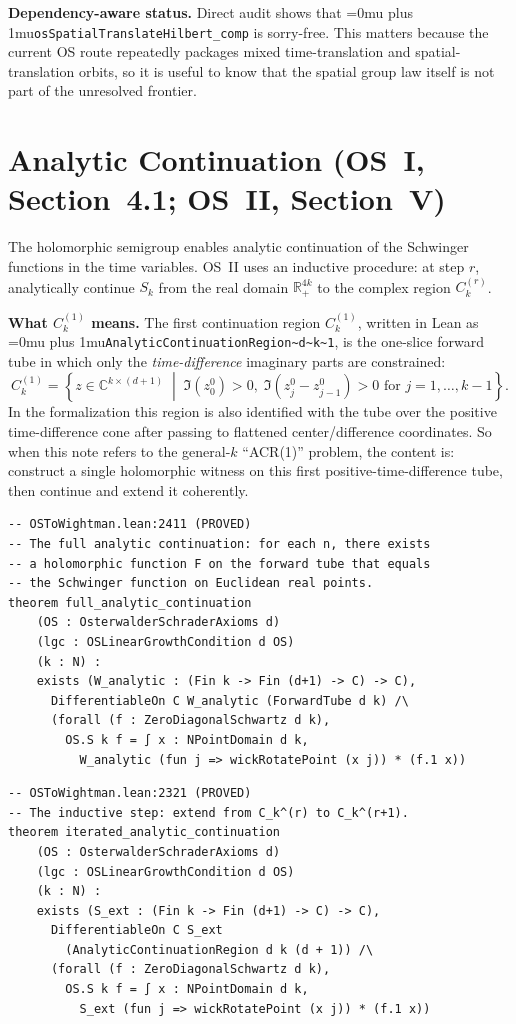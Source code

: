 \documentclass[11pt,a4paper]{article}
\newcommand{\leanname}[1]{\begingroup\Urlmuskip=0mu plus 1mu\relax\nolinkurl{#1}\endgroup}
\begin{document}
\medskip\noindent
\textbf{Dependency-aware status.}
Direct audit shows that \leanname{osSpatialTranslateHilbert\_comp} is
sorry-free. This matters because the current OS route repeatedly packages mixed
time-translation and spatial-translation orbits, so it is useful to know that
the spatial group law itself is not part of the unresolved frontier.


\section{Analytic Continuation (OS~I, Section~4.1; OS~II, Section~V)}

The holomorphic semigroup enables analytic continuation of the Schwinger
functions in the time variables. OS~II uses an inductive procedure:
at step $r$, analytically continue $S_k$ from the real domain $\mathbb{R}^{4k}_+$
to the complex region $C_k^{(r)}$.

\medskip\noindent
\textbf{What \(C_k^{(1)}\) means.}
The first continuation region \(C_k^{(1)}\), written in Lean as
\leanname{AnalyticContinuationRegion~d~k~1}, is the one-slice forward tube in
which only the \emph{time-difference} imaginary parts are constrained:
\[
C_k^{(1)}
=
\left\{
z \in \mathbb{C}^{k \times (d+1)}
\;\middle|\;
\Im(z_0^0) > 0,\;
\Im(z_j^0 - z_{j-1}^0) > 0 \text{ for } j=1,\dots,k-1
\right\}.
\]
In the formalization this region is also identified with the tube over the
positive time-difference cone after passing to flattened center/difference
coordinates. So when this note refers to the general-\(k\) ``ACR(1)'' problem,
the content is: construct a single holomorphic witness on this first
positive-time-difference tube, then continue and extend it coherently.

\begin{lstlisting}
-- OSToWightman.lean:2411 (PROVED)
-- The full analytic continuation: for each n, there exists
-- a holomorphic function F on the forward tube that equals
-- the Schwinger function on Euclidean real points.
theorem full_analytic_continuation
    (OS : OsterwalderSchraderAxioms d)
    (lgc : OSLinearGrowthCondition d OS)
    (k : N) :
    exists (W_analytic : (Fin k -> Fin (d+1) -> C) -> C),
      DifferentiableOn C W_analytic (ForwardTube d k) /\
      (forall (f : ZeroDiagonalSchwartz d k),
        OS.S k f = ∫ x : NPointDomain d k,
          W_analytic (fun j => wickRotatePoint (x j)) * (f.1 x))
\end{lstlisting}

\begin{lstlisting}
-- OSToWightman.lean:2321 (PROVED)
-- The inductive step: extend from C_k^(r) to C_k^(r+1).
theorem iterated_analytic_continuation
    (OS : OsterwalderSchraderAxioms d)
    (lgc : OSLinearGrowthCondition d OS)
    (k : N) :
    exists (S_ext : (Fin k -> Fin (d+1) -> C) -> C),
      DifferentiableOn C S_ext
        (AnalyticContinuationRegion d k (d + 1)) /\
      (forall (f : ZeroDiagonalSchwartz d k),
        OS.S k f = ∫ x : NPointDomain d k,
          S_ext (fun j => wickRotatePoint (x j)) * (f.1 x))
\end{lstlisting}
\end{document}
